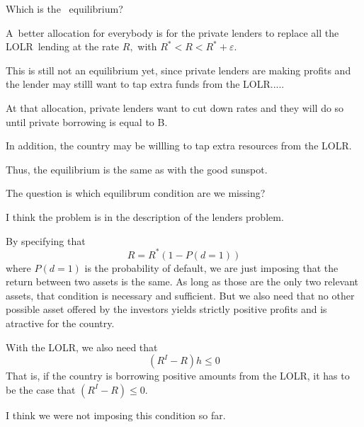 \documentclass[english,12pt,a4paper]{article}
\begin{document}
Which is the \ equilibrium? 

A\ better allocation for everybody is for the private lenders to replace all
the LOLR\ lending at the rate $R,$ with  $R^{\ast }<R<R^{\ast }+\varepsilon .
$

This is still not an equilibrium yet, since private lenders are making
profits and the lender may stilll want to tap extra funds from the LOLR.....

At that allocation, private lenders want to cut down rates and they will do
so until private borrowing is equal to B.

In addition, the country may be willling to tap extra resources from the
LOLR.

Thus, the equilibrium is the same as with the good sunspot.

\bigskip 

The question is which equilibrum condition are we missing?

I think the problem is in the description of the lenders problem.

By specifying that 
\begin{equation*}
R=R^{\ast }(1-P(d=1))
\end{equation*}%
where $P(d=1)$ is the probability of default, we are just imposing that the
return between two assets is the same. As long as those are the only two
relevant assets, that condition is necessary and sufficient. But we also
need that no other possible asset offered by the investors yields strictly
positive profits and is atractive for the country.

With the LOLR, we also need that 
\begin{equation*}
(R^{I}-R)h\leq 0
\end{equation*}%
That is, if the country is borrowing positive amounts from the LOLR, it has
to be the case that $(R^{I}-R)\leq 0.$

\bigskip 

I think we were not imposing this condition so far.

\bigskip 

\bigskip 
\end{document}
